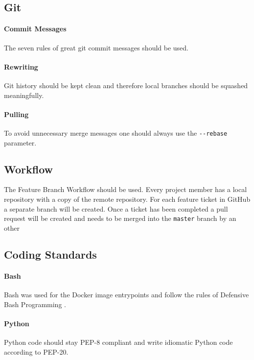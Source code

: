 \subsection{Git}\label{git}
\paragraph{Commit Messages}
The seven rules of great git commit
messages\cite{pm_8_chris.beams.io_2015} should be used.

\paragraph{Rewriting}
Git history should be kept clean and therefore local branches should be
squashed meaningfully.

\paragraph{Pulling}
To avoid unnecessary merge messages one should always use the
\texttt{-\/-rebase} parameter.

\subsection{Workflow}\label{git-workflow}
The Feature Branch Workflow\cite{pm_9_atlassian_git_tutorial_2015} should be used. Every project member has a local repository with a copy of the remote
repository. For each feature ticket in GitHub a separate branch
will be created. Once a ticket has been completed a pull request will be
created and needs to be merged into the \texttt{master} branch by an other 

\subsection{Coding Standards}

\paragraph{Bash} Bash was used for the Docker image entrypoints and follow
the rules of Defensive Bash Programming \cite{pm_10_lavi_2012}.

\paragraph{Python} Python code should stay PEP-8\cite{pm_11_python.org_2015} compliant and write idiomatic Python code according to PEP-20\cite{pm_12_python.org_2015}.

